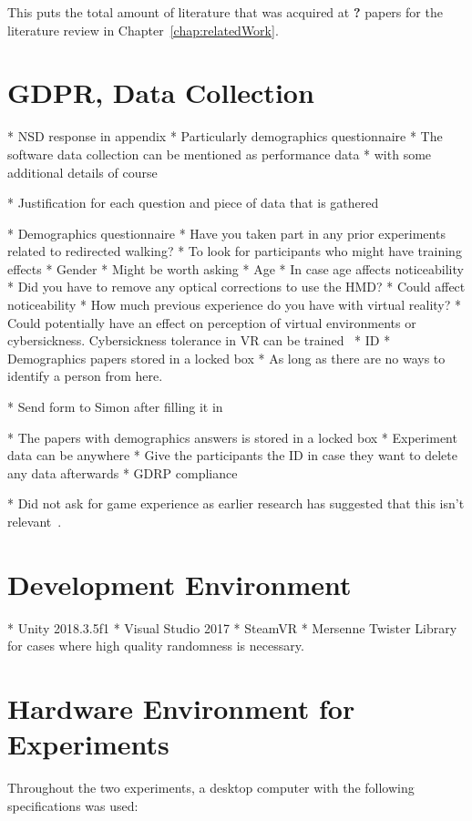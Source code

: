 This puts the total amount of literature that was acquired at \textbf{?} papers for the literature review in Chapter~\ref{chap:relatedWork}.

\section{GDPR, Data Collection}
* NSD response in appendix
* Particularly demographics questionnaire
* The software data collection can be mentioned as performance data
   * with some additional details of course
   
* Justification for each question and piece of data that is gathered

* Demographics questionnaire
   * Have you taken part in any prior experiments related to redirected walking?
      * To look for participants who might have training effects 
   * Gender
      * Might be worth asking
   * Age
      * In case age affects noticeability
   * Did you have to remove any optical corrections to use the HMD?
      * Could affect noticeability
   * How much previous experience do you have with virtual reality?
      * Could potentially have an effect on perception of virtual environments or cybersickness. Cybersickness tolerance in VR can be trained~\cite{hildebrandt2018get}
   * ID
      * Demographics papers stored in a locked box
   * As long as there are no ways to identify a person from here. 

* Send form to Simon after filling it in

* The papers with demographics answers is stored in a locked box 
* Experiment data can be anywhere
* Give the participants the ID in case they want to delete any data afterwards
   * GDRP compliance

* Did not ask for game experience as earlier research has suggested that this isn't relevant~\cite{nguyen2018individual}.

\section{Development Environment}
* Unity 2018.3.5f1
* Visual Studio 2017
* SteamVR
* Mersenne Twister Library for cases where high quality randomness is necessary.

\section{Hardware Environment for Experiments}
Throughout the two experiments, a desktop computer with the following specifications was used:

